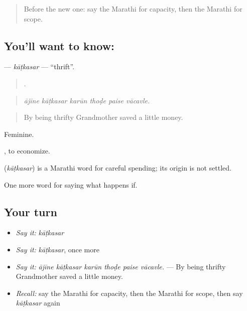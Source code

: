 \label{lesson:MR-C557-katkasar}



\begin{quote}
Before the new one: say the Marathi for capacity, then the Marathi for scope.
\end{quote}

\subsection*{You'll want to know: }
\textbf{} — \emph{kāṭkasar} — \textquotedblleft{}thrift\textquotedblright{}.

\begin{quote}
     .
\end{quote}

\begin{quote}
\emph{ājīne kāṭkasar karūn thoḍe paise vācavle.}
\end{quote}

\begin{quote}
By being thrifty Grandmother saved a little money.
\end{quote}

Feminine.

 , to economize.

\begin{cousinweb}
\textbf{} (\emph{kāṭkasar}) is a Marathi word for careful spending; its origin is not settled.
\end{cousinweb}

\begin{grammarlens}[title={What you've built}]
One more word for saying what happens if.
\end{grammarlens}

\subsection*{Your turn}
\begin{itemize}
\raggedright
  \item \emph{Say it:} \emph{kāṭkasar}
  \item \emph{Say it:} \emph{kāṭkasar}, once more
  \item \emph{Say it:} \emph{ājīne kāṭkasar karūn thoḍe paise vācavle.} — By being thrifty Grandmother saved a little money.
  \item \emph{Recall:} say the Marathi for capacity, then the Marathi for scope, then say \emph{kāṭkasar} again
\end{itemize}

